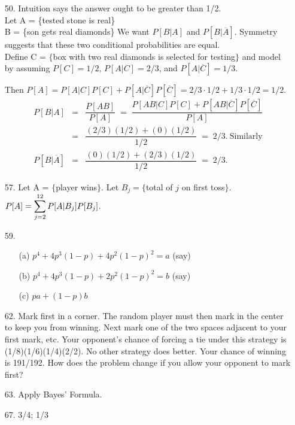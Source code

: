 \begin{enumerate}
	\item[50.] Intuition says the answer ought to be greater than 1/2. \\
	Let A = \{tested stone is real\} \\
	\phantom{Let} B = \{son gets real diamonds\}
	We want $P[B\vert A]$ and $P[B\vert \overline{A}]$.  Symmetry suggests that these two conditional probabilities are equal. \\
	Define C = $\{$box with two real diamonds is selected for testing$\}$ and model by assuming $P[C]=1/2$, $P[A\vert C]=2/3$, and $P[A\vert \overline{C}]=1/3$.
	 
	\newpage
	Then $P[A]=P[A\vert C]P[C] + P[A\vert \overline{C}]P[\overline{C}] =2/3\cdot 1/2+1/3\cdot 1/2 = 1/2$. 
	\begin{eqnarray*}
	P[B\vert A] &=& \dfrac{P[AB]}{P[A]} \;=\; \dfrac{P[AB\vert C]P[C] + P[AB\vert \overline{C}]P[\overline{C}]}{P[A]} \\
	&=& \dfrac{(2/3)(1/2)+(0)(1/2)}{1/2} \;=\; 2/3.\ \text{Similarly} \\
	P[B\vert \overline{A}] &=& \dfrac{(0)(1/2)+(2/3)(1/2)}{1/2} \;=\; 2/3.
	\end{eqnarray*}
	
	\item[57.] Let A = $\{$player wins$\}$.  Let $B_j = \{$total of $j$ on first toss$\}$. \\
	$\displaystyle P[A] = \sum_{j=2}^{12}P[A\vert B_j]P[B_j]$.
	
	\item[59.] \begin{enumerate}
		\item[(a)] $p^4 + 4p^3(1-p) + 4p^2(1-p)^2 = a$ (say)
		\item[(b)] $p^4 +4p^3(1-p) +2p^2(1-p)^2 =b$ (say)
		\item[(c)] $pa + (1-p)b$		
	\end{enumerate}

	\item[62.] Mark first in a corner.  The random player must then mark in the center to keep you from winning.  Next mark one of the two spaces adjacent to your first mark, etc.  Your opponent's chance of forcing a tie under this strategy is (1/8)(1/6)(1/4)(2/2).  No other strategy does better.  Your chance of winning is 191/192.  How does the problem change if you allow your opponent to mark first?
	
	\item[63.] Apply Bayes' Formula.
	
	\item[67.] 3/4; 1/3


\end{enumerate}
